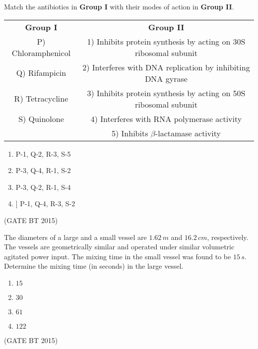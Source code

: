\item Match the antibiotics in \textbf{Group I} with their modes of action in \textbf{Group II}.  

\begin{table}[H]
\begin{tabular}{cc}
\textbf{Group I} & \textbf{Group II} \\
P) Chloramphenicol      & 1) Inhibits protein synthesis by acting on 30S ribosomal subunit \\
Q) Rifampicin           & 2) Interferes with DNA replication by inhibiting DNA gyrase \\
R) Tetracycline         & 3) Inhibits protein synthesis by acting on 50S ribosomal subunit \\
S) Quinolone            & 4) Interferes with RNA polymerase activity \\
                        & 5) Inhibits $\beta$-lactamase activity \\
\end{tabular}
\end{table}

\begin{multicols}{2}
\begin{enumerate}
    \item P-1, Q-2, R-3, S-5
    \item P-3, Q-4, R-1, S-2
    \item P-3, Q-2, R-1, S-4
    \item] P-1, Q-4, R-3, S-2
\end{enumerate}
\end{multicols}\hfill (GATE BT 2015)






\item The diameters of a large and a small vessel are $1.62 \, m$ and $16.2 \, cm$, respectively. The vessels are geometrically similar and operated under similar volumetric agitated power input. The mixing time in the small vessel was found to be $15 \, s$. Determine the mixing time (in seconds) in the large vessel.  

\begin{multicols}{4}
\begin{enumerate}
    \item $15$  
    \item $30$  
    \item $61$  
    \item $122$  
\end{enumerate}
\end{multicols}\hfill (GATE BT 2015)




